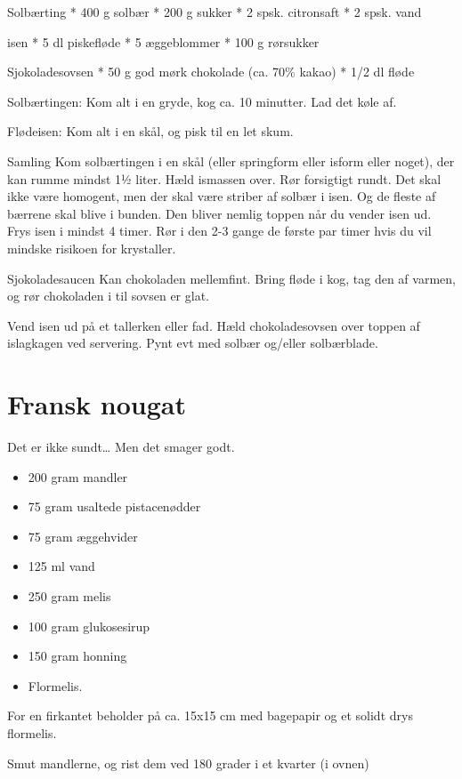 \documentclass[
  letterpaper,
  DIV=11,
  numbers=noendperiod]{scrreprt}
\providecommand{\tightlist}{%
  \setlength{\itemsep}{0pt}\setlength{\parskip}{0pt}}\usepackage{longtable,booktabs,array}
\begin{document}
Solbærting * 400 g solbær * 200 g sukker * 2 spsk. citronsaft * 2 spsk.
vand

isen * 5 dl piskefløde * 5 æggeblommer * 100 g rørsukker

Sjokoladesovsen * 50 g god mørk chokolade (ca. 70\% kakao) * 1/2 dl
fløde

Solbærtingen: Kom alt i en gryde, kog ca. 10 minutter. Lad det køle af.

Flødeisen: Kom alt i en skål, og pisk til en let skum.

Samling Kom solbærtingen i en skål (eller springform eller isform eller
noget), der kan rumme mindst 1½ liter. Hæld ismassen over. Rør
forsigtigt rundt. Det skal ikke være homogent, men der skal være striber
af solbær i isen. Og de fleste af bærrene skal blive i bunden. Den
bliver nemlig toppen når du vender isen ud. Frys isen i mindst 4 timer.
Rør i den 2-3 gange de første par timer hvis du vil mindske risikoen for
krystaller.

Sjokoladesaucen Kan chokoladen mellemfint. Bring fløde i kog, tag den af
varmen, og rør chokoladen i til sovsen er glat.

Vend isen ud på et tallerken eller fad. Hæld chokoladesovsen over toppen
af islagkagen ved servering. Pynt evt med solbær og/eller solbærblade.

\hypertarget{fransk-nougat}{%
\section{Fransk nougat}\label{fransk-nougat}}

Det er ikke sundt\ldots{} Men det smager godt.

\begin{itemize}
\tightlist
\item
  200 gram mandler
\item
  75 gram usaltede pistacenødder
\item
  75 gram æggehvider
\item
  125 ml vand
\item
  250 gram melis
\item
  100 gram glukosesirup
\item
  150 gram honning
\item
  Flormelis.
\end{itemize}

For en firkantet beholder på ca. 15x15 cm med bagepapir og et solidt
drys flormelis.

Smut mandlerne, og rist dem ved 180 grader i et kvarter (i ovnen)
\end{document}
